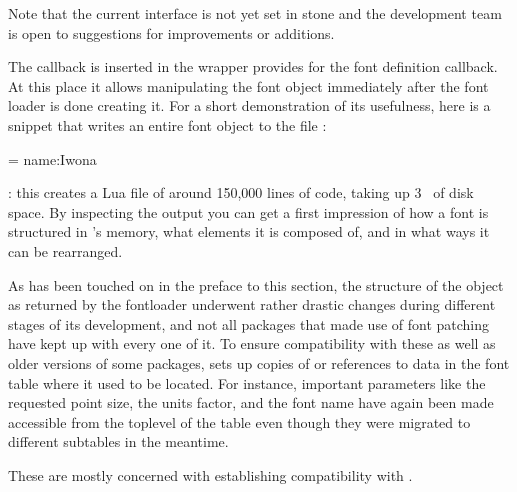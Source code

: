 Note that the current interface is not yet set in stone and the
development team is open to suggestions for improvements or
additions.


The  callback is inserted in the wrapper
 provides for the font definition callback.
%
At this place it allows manipulating the font object immediately after
the font loader is done creating it.
%
For a short demonstration of its usefulness, here is a snippet that
writes an entire font object to the file :

\beginlisting
  
  \font \dumpme = name:Iwona
  \bye
\endlisting

: this creates a Lua file of around 150,000 lines of
code, taking up 3~ of disk space.
%
By inspecting the output you can get a first impression of how a font
is structured in \LUATEX’s memory, what elements it is composed of,
and in what ways it can be rearranged.


As has been touched on in the preface to this section, the structure
of the object as returned by the fontloader underwent rather drastic
changes during different stages of its development, and not all
packages that made use of font patching have kept up with every one
of it.
%
To ensure compatibility with these as well as older versions of
some packages,  sets up copies of or references
to data in the font table where it used to be located.
%
For instance, important parameters like the requested point size, the
units factor, and the font name have again been made accessible from
the toplevel of the table even though they were migrated to different
subtables in the meantime.

\endsubsubsection


These are mostly concerned with establishing compatibility with \XETEX.

\beginfunctionlist

